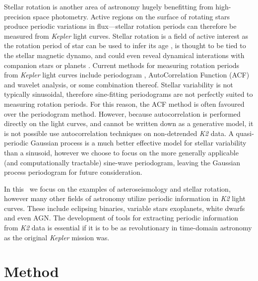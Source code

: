 \documentclass[useAMS, usenatbib, preprint, 12pt]{aastex}
\begin{document}
Stellar rotation is another area of astronomy hugely benefitting from
high-precision space photometry.
Active regions on the surface of rotating stars produce periodic variations
in flux---stellar rotation periods can therefore be measured from
{\it Kepler} light curves.
Stellar rotation is a field of active interest as the rotation period of star
can be used to infer its age \citep{Skumanich1972, Barnes2007, Epstein2014},
is thought to be tied to the stellar magnetic dynamo, and could even reveal
dynamical interations with companion stars or planets \citep[e.g.][]{Beky2014,
Poppenhaeger2014}.
Current methods for measuring rotation periods from {\it Kepler} light curves
include periodogram \citep[e.g.][]{Reinhold2013}, AutoCorrelation Function
(ACF) \citep{McQuillan2013} and wavelet \citep[e.g.][]{Garcia2014} analysis,
or some combination thereof.
Stellar variability is not typically sinusoidal, therefore sine-fitting
periodograms are not perfectly suited to measuring rotation periods.
For this reason, the ACF method is often favoured over the periodogram method.
However, because autocorrelation is performed directly on the light curves,
and cannot be written down as a generative model, it is not possible use
autocorrelation techniques on non-detrended {\it K2} data.
A quasi-periodic Gaussian process is a much better effective model for stellar
variability than a sinusoid, however we choose to focus on the more generally
applicable (and computationally tractable) sine-wave periodogram, leaving the
Gaussian process periodogram for future consideration.

In this \article\ we focus on the examples of asteroseismology and stellar
rotation, however many other fields of astronomy utilize periodic information
in {\it K2} light curves.
These include eclipsing binaries, variable stars exoplanets, white dwarfs and
even AGN.
The development of tools for extracting periodic information from {\it K2}
data is essential if it is to be as revolutionary in time-domain
astronomy as the original {\it Kepler} mission was.

\section{Method}
\label{sec:Method}
\end{document}
